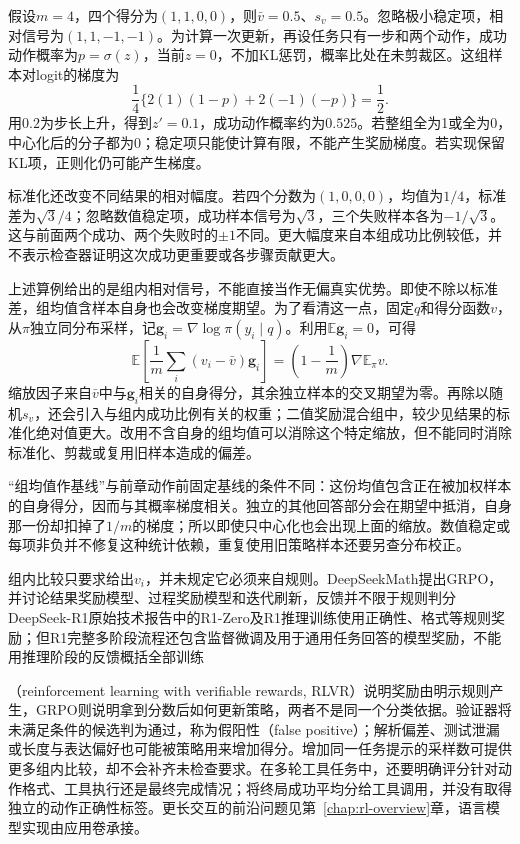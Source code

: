 \begin{example}[一组验证得分的更新信号]
  \label{ex:rl-reward-grpo}
  假设$m=4$，四个得分为$(1,1,0,0)$，则$\bar v=0.5$、$s_v=0.5$。忽略极小稳定项，相对信号为$(1,1,-1,-1)$。为计算一次更新，再设任务只有一步和两个动作，成功动作概率为$p=\sigma(z)$，当前$z=0$，不加KL惩罚，概率比处在未剪裁区。这组样本对logit的梯度为
  \[
    \frac14\{2(1)(1-p)+2(-1)(-p)\}=\frac12.
  \]
  用$0.2$为步长上升，得到$z'=0.1$，成功动作概率约为$0.525$。若整组全为1或全为0，中心化后的分子都为0；稳定项只能使计算有限，不能产生奖励梯度。若实现保留KL项，正则化仍可能产生梯度。
\end{example}

标准化还改变不同结果的相对幅度。若四个分数为$(1,0,0,0)$，均值为$1/4$，标准差为$\sqrt3/4$；忽略数值稳定项，成功样本信号为$\sqrt3$，三个失败样本各为$-1/\sqrt3$。这与前面两个成功、两个失败时的$\pm1$不同。更大幅度来自本组成功比例较低，并不表示检查器证明这次成功更重要或各步骤贡献更大。

上述算例给出的是组内相对信号，不能直接当作无偏真实优势。即使不除以标准差，组均值含样本自身也会改变梯度期望。为了看清这一点，固定$q$和得分函数$v$，从$\pi$独立同分布采样，记$\bm g_i=\nabla\log\pi(y_i\mid q)$。利用$\mathbb E\bm g_i=0$，可得
\[
  \mathbb E\left[\frac1m\sum_i(v_i-\bar v)\bm g_i\right]
  =\left(1-\frac1m\right)\nabla\mathbb E_\pi v.
\]
缩放因子来自$\bar v$中与$\bm g_i$相关的自身得分，其余独立样本的交叉期望为零。再除以随机$s_v$，还会引入与组内成功比例有关的权重；二值奖励混合组中，较少见结果的标准化绝对值更大。改用不含自身的组均值可以消除这个特定缩放，但不能同时消除标准化、剪裁或复用旧样本造成的偏差。

“组均值作基线”与前章动作前固定基线的条件不同：这份均值包含正在被加权样本的自身得分，因而与其概率梯度相关。独立的其他回答部分会在期望中抵消，自身那一份却扣掉了$1/m$的梯度；所以即使只中心化也会出现上面的缩放。数值稳定或每项非负并不修复这种统计依赖，重复使用旧策略样本还要另查分布校正。

组内比较只要求给出$v_i$，并未规定它必须来自规则。DeepSeekMath提出GRPO，并讨论结果奖励模型、过程奖励模型和迭代刷新，反馈并不限于规则判分
DeepSeek-R1原始技术报告中的R1-Zero及R1推理训练使用正确性、格式等规则奖励；但R1完整多阶段流程还包含监督微调及用于通用任务回答的模型奖励，不能用推理阶段的反馈概括全部训练

（reinforcement learning with verifiable rewards, RLVR）说明奖励由明示规则产生，GRPO则说明拿到分数后如何更新策略，两者不是同一个分类依据。验证器将未满足条件的候选判为通过，称为假阳性（false positive）；解析偏差、测试泄漏或长度与表达偏好也可能被策略用来增加得分。增加同一任务提示的采样数可提供更多组内比较，却不会补齐未检查要求。在多轮工具任务中，还要明确评分针对动作格式、工具执行还是最终完成情况；将终局成功平均分给工具调用，并没有取得独立的动作正确性标签。更长交互的前沿问题见第~\ref{chap:rl-overview}章，语言模型实现由应用卷承接。

